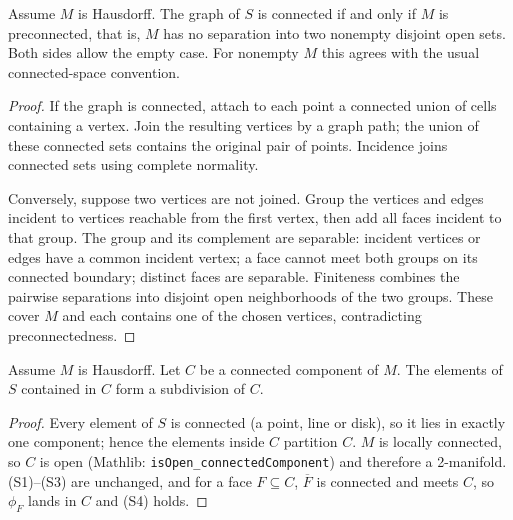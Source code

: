     \begin{theorem}\label{thm:graph-connected-iff}

      Assume $M$ is Hausdorff. The graph of $S$ is connected if and only if
      $M$ is preconnected, that is, $M$ has no separation into two nonempty
      disjoint open sets. Both sides allow the empty case. For nonempty $M$
      this agrees with the usual connected-space convention.
    \end{theorem}
    \begin{proof}

      If the graph is connected, attach to each point a connected union of
      cells containing a vertex. Join the resulting vertices by a graph path;
      the union of these connected sets contains the original pair of points.
      Incidence joins connected sets using complete normality.

      Conversely, suppose two vertices are not joined. Group the vertices
      and edges incident to vertices reachable from the first vertex, then
      add all faces incident to that group. The group and its complement are
      separable: incident vertices or edges have a common incident vertex;
      a face cannot meet both groups on its connected boundary; distinct
      faces are separable. Finiteness combines the pairwise separations into
      disjoint open neighborhoods of the two groups. These cover $M$ and
      each contains one of the chosen vertices, contradicting preconnectedness.
    \end{proof}

    \begin{lemma}\label{lem:restrict-component}

      Assume $M$ is Hausdorff. Let $C$ be a connected component of $M$.
      The elements of $S$ contained
      in $C$ form a subdivision of $C$.
    \end{lemma}
    \begin{proof}

      Every element of $S$ is connected (a point, line or disk), so it lies in
      exactly one component; hence the elements inside $C$ partition $C$. $M$
      is locally connected, so $C$ is open (Mathlib:
      \texttt{isOpen\_connectedComponent}) and therefore a 2-manifold.
      (S1)--(S3) are unchanged, and for a face $F \subseteq C$, $\overline{F}$
      is connected and meets $C$, so $\phi_F$ lands in $C$ and (S4) holds.
    \end{proof}

